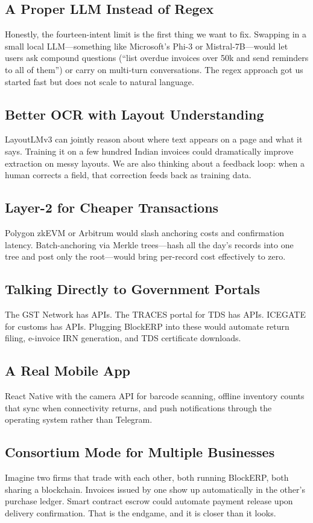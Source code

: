 \documentclass[conference]{IEEEtran}
\begin{document}
\subsection{A Proper LLM Instead of Regex}
Honestly, the fourteen-intent limit is the first thing we want to fix. Swapping in a small local LLM---something like Microsoft's Phi-3 or Mistral-7B---would let users ask compound questions (``list overdue invoices over 50k and send reminders to all of them'') or carry on multi-turn conversations. The regex approach got us started fast but does not scale to natural language.

\subsection{Better OCR with Layout Understanding}
LayoutLMv3 can jointly reason about where text appears on a page and what it says. Training it on a few hundred Indian invoices could dramatically improve extraction on messy layouts. We are also thinking about a feedback loop: when a human corrects a field, that correction feeds back as training data.

\subsection{Layer-2 for Cheaper Transactions}
Polygon zkEVM or Arbitrum would slash anchoring costs and confirmation latency. Batch-anchoring via Merkle trees---hash all the day's records into one tree and post only the root---would bring per-record cost effectively to zero.

\subsection{Talking Directly to Government Portals}
The GST Network has APIs. The TRACES portal for TDS has APIs. ICEGATE for customs has APIs. Plugging BlockERP into these would automate return filing, e-invoice IRN generation, and TDS certificate downloads.

\subsection{A Real Mobile App}
React Native with the camera API for barcode scanning, offline inventory counts that sync when connectivity returns, and push notifications through the operating system rather than Telegram.

\subsection{Consortium Mode for Multiple Businesses}
Imagine two firms that trade with each other, both running BlockERP, both sharing a blockchain. Invoices issued by one show up automatically in the other's purchase ledger. Smart contract escrow could automate payment release upon delivery confirmation. That is the endgame, and it is closer than it looks.
\end{document}
